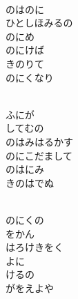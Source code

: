 \documentclass[10pt,b5j]{tarticle} %
\begin{document}
\begin{enumerate}
\begin{minipage}[c]{\blocksize}
        \vspace{\linespace}
        \item~\\
        のはのに\\
        ひとしほみるの\\
        のにめ\\
        のにけば\\
        きのりて\\
        のにくなり
        
        \vspace{\linespace}
        \item~\\
        ふにが\\
        してむの\\
        のはみはるかす\\
        のにこだまして\\
        のはにみ\\
        きのはでぬ
        
        \vspace{\linespace}
        \item~\\
        のにくの\\
        をかん\\
        はろけきをく\\
        よに\\
        けるの\\
        がをえよや
    
    \end{minipage}
\end{enumerate} %
\end{document}

